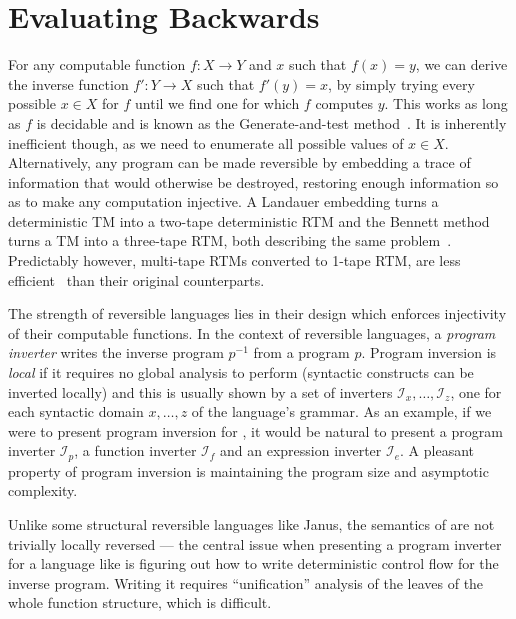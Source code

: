\chapter{Evaluating Backwards}\label{sec:running_backwards}

For any computable function $f : X \rightarrow Y$ and $x$ such that $f(x) = y$,
we can derive the inverse function $f' : Y \rightarrow X$ such that $f'(y) =
x$, by simply trying every possible $x \in X$ for $f$ until we find one for
which $f$ computes $y$. This works as long as $f$ is decidable and is known as
the Generate-and-test method~\cite{Mccarthy:1956}. It is inherently inefficient
though, as we need to enumerate all possible values of $x \in X$.
Alternatively, any program can be made reversible by embedding a trace of
information that would otherwise be destroyed, restoring enough information so
as to make any computation injective. A Landauer embedding turns a
deterministic TM into a two-tape deterministic RTM and the Bennett method turns
a TM into a three-tape RTM, both describing the same
problem~\cite{AxelsenGlueck:2011:FoSSaCS, Bennett:1973}. Predictably however,
multi-tape RTMs converted to 1-tape RTM, are less efficient~\cite{Axelsen:2011}
than their original counterparts.

The strength of reversible languages lies in their design which enforces
injectivity of their computable functions. In the context of reversible
languages, a \emph{program inverter} writes the inverse program $p^{-1}$ from a
program $p$. Program inversion is \emph{local} if it requires no global
analysis to perform (syntactic constructs can be inverted locally) and this is
usually shown by a set of inverters $\mathcal{I}_x, \dots, \mathcal{I}_z$, one
for each syntactic domain $x, \dots, z$ of the language's grammar. As an
example, if we were to present program inversion for \rfunc, it would be
natural to present a program inverter $\mathcal{I}_p$, a function inverter
$\mathcal{I}_f$ and an expression inverter $\mathcal{I}_e$. A pleasant property
of program inversion is maintaining the program size and asymptotic complexity.

Unlike some structural reversible languages like Janus, the semantics of \rfunc
are not trivially locally reversed --- the central issue when presenting a
program inverter for a language like \rfunc is figuring out how to write
deterministic control flow for the inverse program. Writing it requires
``unification'' analysis of the leaves of the whole function structure, which
is difficult.

